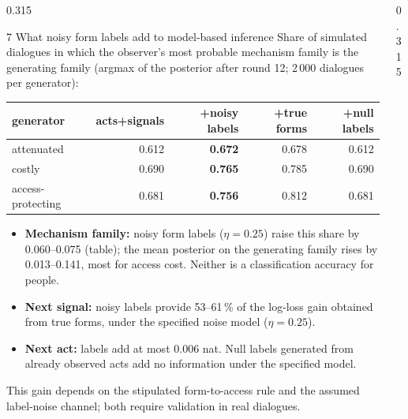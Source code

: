 \documentclass[final,t]{beamer}
\begin{document}
\begin{frame}[t]
\begin{columns}[t,totalwidth=0.965\paperwidth]
\begin{column}{0.315\textwidth}
\begin{block}{7 \; What noisy form labels add to model-based inference}
\small Share of simulated dialogues in which the observer's most probable mechanism family is the generating family (argmax of the posterior after round 12; 2\,000 dialogues per generator):\normalsize\\[0.1cm]
{\small\begin{tabular}{@{}lrrrr@{}}
\toprule
generator & acts+signals & +noisy labels & +true forms & +null labels\\
\midrule
attenuated & 0.612 & \textbf{0.672} & 0.678 & 0.612\\
costly & 0.690 & \textbf{0.765} & 0.785 & 0.690\\
access-protecting & 0.681 & \textbf{0.756} & 0.812 & 0.681\\
\bottomrule
\end{tabular}}
\smallskip

\begin{itemize}\setlength{\itemsep}{1pt}
\item \textbf{Mechanism family:} noisy form labels ($\eta=0.25$) raise this share by 0.060--0.075 (table); the mean posterior on the generating family rises by 0.013--0.141, most for access cost. Neither is a classification accuracy for people.
\item \textbf{Next signal:} noisy labels provide 53--61\,\% of the log-loss gain obtained from true forms, under the specified noise model ($\eta=0.25$).
\item \textbf{Next act:} labels add at most 0.006 nat. Null labels generated from already observed acts add no information under the specified model.
\end{itemize}
This gain depends on the stipulated form-to-access rule and the assumed label-noise channel; both require validation in real dialogues.

\end{block}

\end{column}

\begin{column}{0.315\textwidth}


\end{column}
\end{columns}
\end{frame}
\end{document}
